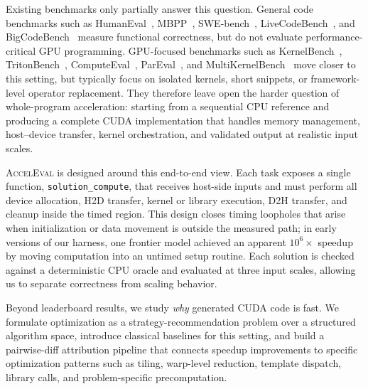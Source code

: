 \documentclass{article}
\begin{document}
Existing benchmarks only partially answer this question. General code benchmarks such as HumanEval~\citep{humaneval}, MBPP~\citep{mbpp}, SWE-bench~\citep{swebench}, LiveCodeBench~\citep{livecodebench}, and BigCodeBench~\citep{bigcodebench} measure functional correctness, but do not evaluate performance-critical GPU programming. GPU-focused benchmarks such as KernelBench~\citep{kernelbench}, TritonBench~\citep{tritonbench}, ComputeEval~\citep{computeeval}, ParEval~\citep{pareval}, and MultiKernelBench~\citep{multikernelbench} move closer to this setting, but typically focus on isolated kernels, short snippets, or framework-level operator replacement. They therefore leave open the harder question of whole-program acceleration: starting from a sequential CPU reference and producing a complete CUDA implementation that handles memory management, host--device transfer, kernel orchestration, and validated output at realistic input scales.

\textsc{AccelEval} is designed around this end-to-end view. Each task exposes a single function, \texttt{solution\_compute}, that receives host-side inputs and must perform all device allocation, H2D transfer, kernel or library execution, D2H transfer, and cleanup inside the timed region. This design closes timing loopholes that arise when initialization or data movement is outside the measured path; in early versions of our harness, one frontier model achieved an apparent $10^{6}\times$ speedup by moving computation into an untimed setup routine. Each solution is checked against a deterministic CPU oracle and evaluated at three input scales, allowing us to separate correctness from scaling behavior.

Beyond leaderboard results, we study \emph{why} generated CUDA code is fast. We formulate optimization as a strategy-recommendation problem over a structured algorithm space, introduce classical baselines for this setting, and build a pairwise-diff attribution pipeline that connects speedup improvements to specific optimization patterns such as tiling, warp-level reduction, template dispatch, library calls, and problem-specific precomputation.
\end{document}
